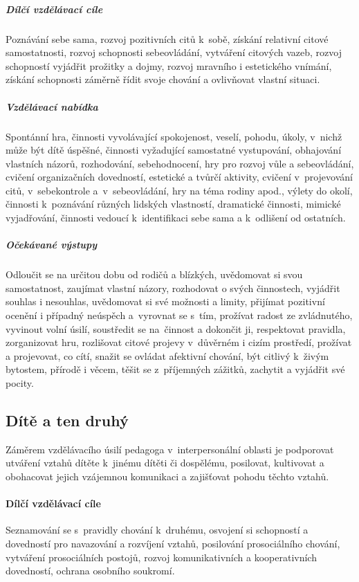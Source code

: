 					\subparagraph{Dílčí vzdělávací cíle}
						Poznávání sebe sama, rozvoj pozitivních citů k sobě, získání relativní citové samostatnosti, rozvoj schopnosti sebeovládání, vytváření citových vazeb, rozvoj schopností vyjádřit prožitky a dojmy, rozvoj mravního i estetického vnímání, získání schopnosti záměrně řídit svoje chování a ovlivňovat vlastní situaci.
					\subparagraph{Vzdělávací nabídka}
						Spontánní hra, činnosti vyvolávající spokojenost, veselí, pohodu, úkoly, v nichž může být dítě úspěšné, činnosti vyžadující samostatné vystupování, obhajování vlastních názorů, rozhodování, sebehodnocení, hry pro rozvoj vůle a sebeovládání, cvičení organizačních dovedností, estetické a tvůrčí aktivity, cvičení v projevování citů, v sebekontrole a v sebeovládání, hry na téma rodiny apod., výlety do okolí, činnosti k poznávání různých lidských vlastností, dramatické činnosti, mimické vyjadřování, činnosti vedoucí k identifikaci sebe sama a k odlišení od ostatních.
					\subparagraph{Očekávané výstupy}
						Odloučit se na určitou dobu od rodičů a blízkých, uvědomovat si svou samostatnost, zaujímat vlastní názory, rozhodovat o svých činnostech, vyjádřit souhlas i nesouhlas, uvědomovat si své možnosti a limity, přijímat pozitivní ocenění i případný neúspěch a vyrovnat se s tím, prožívat radost ze zvládnutého, vyvinout volní úsilí, soustředit se na činnost a dokončit ji, respektovat pravidla, zorganizovat hru, rozlišovat citové projevy v důvěrném i cizím prostředí, prožívat a projevovat, co cítí, snažit se ovládat afektivní chování, být citlivý k živým bytostem, přírodě i věcem, těšit se z příjemných zážitků, zachytit a vyjádřit své pocity.

			\subsection{Dítě a ten druhý}
				Záměrem vzdělávacího úsilí pedagoga v interpersonální oblasti je podporovat utváření vztahů dítěte k jinému dítěti či dospělému, posilovat, kultivovat a obohacovat jejich vzájemnou komunikaci a zajišťovat pohodu těchto vztahů.
					\paragraph{Dílčí vzdělávací cíle}
						Seznamování se s pravidly chování k druhému, osvojení si schopností a dovedností pro navazování a rozvíjení vztahů, posilování prosociálního chování, vytváření prosociálních postojů, rozvoj komunikativních a kooperativních dovedností, ochrana osobního soukromí.
